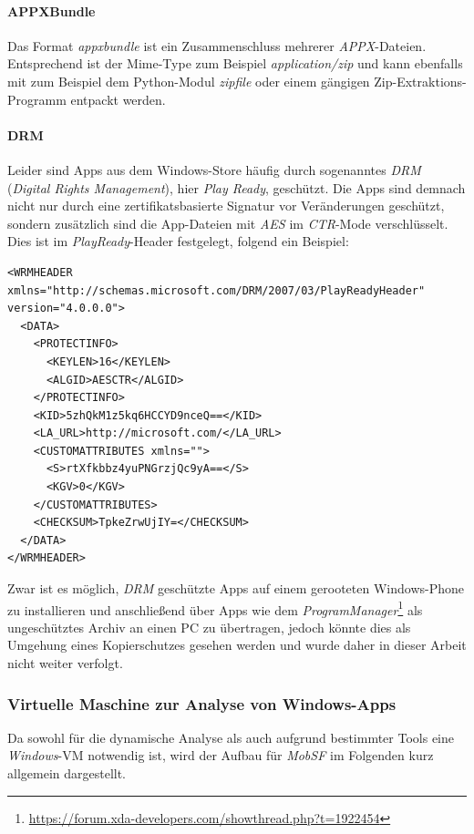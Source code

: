 \paragraph{APPXBundle}
Das Format \textit{appxbundle} ist ein Zusammenschluss mehrerer \textit{APPX}-Dateien. Entsprechend ist der Mime-Type zum Beispiel \textit{application/zip} und kann ebenfalls mit zum Beispiel dem Python-Modul \textit{zipfile} oder einem gängigen Zip-Extraktions-Programm entpackt werden.

\paragraph{DRM}
Leider sind Apps aus dem Windows-Store häufig durch sogenanntes \textit{DRM} (\textit{Digital Rights Management}), hier \textit{Play Ready}, geschützt. Die Apps sind demnach nicht nur durch eine zertifikatsbasierte Signatur vor Veränderungen geschützt, sondern zusätzlich sind die App-Dateien mit \textit{AES} im \textit{CTR}-Mode verschlüsselt. Dies ist im \textit{PlayReady}-Header festgelegt, folgend ein Beispiel:
\begin{lstlisting}
<WRMHEADER xmlns="http://schemas.microsoft.com/DRM/2007/03/PlayReadyHeader" version="4.0.0.0">
  <DATA>
    <PROTECTINFO>
      <KEYLEN>16</KEYLEN>
      <ALGID>AESCTR</ALGID>
    </PROTECTINFO>
    <KID>5zhQkM1z5kq6HCCYD9nceQ==</KID>
    <LA_URL>http://microsoft.com/</LA_URL>
    <CUSTOMATTRIBUTES xmlns="">
      <S>rtXfkbbz4yuPNGrzjQc9yA==</S>
      <KGV>0</KGV>
    </CUSTOMATTRIBUTES>
    <CHECKSUM>TpkeZrwUjIY=</CHECKSUM>
  </DATA>
</WRMHEADER>
\end{lstlisting}

Zwar ist es möglich, \textit{DRM} geschützte Apps auf einem gerooteten Windows-Phone zu installieren und anschließend über Apps wie dem \textit{ProgramManager}\footnote{\url{https://forum.xda-developers.com/showthread.php?t=1922454}} als ungeschütztes Archiv an einen PC zu übertragen, jedoch könnte dies als Umgehung eines Kopierschutzes gesehen werden und wurde daher in dieser Arbeit nicht weiter verfolgt.

\newpage
\subsubsection{Virtuelle Maschine zur Analyse von Windows-Apps}
Da sowohl für die dynamische Analyse als auch aufgrund bestimmter Tools eine \textit{Windows}-VM notwendig ist, wird der Aufbau für \textit{MobSF} im Folgenden kurz allgemein dargestellt.\\

